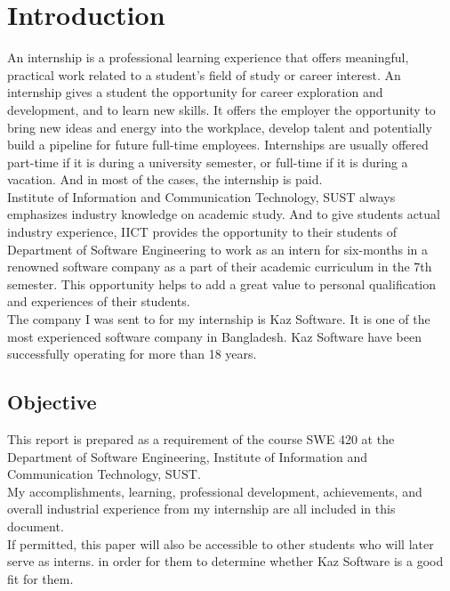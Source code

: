 \chapter{Introduction}

An internship is a professional learning experience that offers meaningful, practical work related to a student’s field of study or career interest.
An internship gives a student the opportunity for career exploration and development, and to learn new skills.
It offers the employer the opportunity to bring new ideas and energy into the workplace, develop talent and potentially build a pipeline for future full-time employees.
Internships are usually offered part-time if it is during a university semester, or full-time if it is during a vacation.
And in most of the cases, the internship is paid. \\

Institute of Information and Communication Technology, SUST always emphasizes industry knowledge on academic study. 
And to give students actual industry experience, IICT provides the opportunity to their students of Department of Software Engineering to work as an intern for six-months in a renowned software company as a part of their academic curriculum in the 7th semester.
This opportunity helps to add a great value to personal qualification and experiences of their students. \\

The company I was sent to for my internship is Kaz Software. It is one of the most experienced software company in Bangladesh. Kaz Software have been successfully operating for more than 18 years.

\section{Objective}

This report is prepared as a requirement of the course SWE 420 at the Department of Software Engineering, Institute of Information and Communication Technology, SUST.\\


My accomplishments, learning, professional development, achievements, and overall industrial experience from my internship are all included in this document.\\


If permitted, this paper will also be accessible to other students who will later serve as interns. in order for them to determine whether Kaz Software is a good fit for them.

